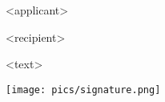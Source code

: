 \documentclass[12pt]{article}
\begin{document}
\vspace{2em}

<applicant>

<recipient>



<text>

\texttt{[image: pics/signature.png]}
\newline{}
\end{document}
